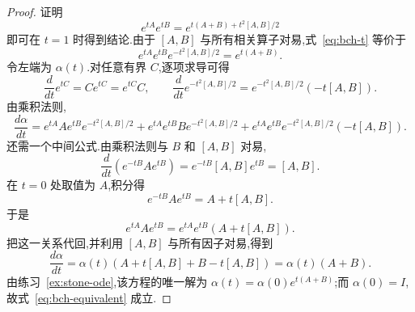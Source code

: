 \begin{proof}
证明
\[
e^{tA}e^{tB}=e^{t(A+B)+t^2[A,B]/2}
\label{eq:bch-t}
\]
即可在 $t=1$ 时得到结论.由于 $[A,B]$ 与所有相关算子对易,式~\eqref{eq:bch-t} 等价于
\[
e^{tA}e^{tB}e^{-t^2[A,B]/2}=e^{t(A+B)}.
\label{eq:bch-equivalent}
\]
令左端为 $\alpha(t)$.对任意有界 $C$,逐项求导可得
\[
\frac{d}{dt}e^{tC}=Ce^{tC}=e^{tC}C,
\qquad
\frac{d}{dt}e^{-t^2[A,B]/2}=e^{-t^2[A,B]/2}(-t[A,B]).
\]
由乘积法则,
\[
\frac{d\alpha}{dt}=e^{tA}Ae^{tB}e^{-t^2[A,B]/2}
+e^{tA}e^{tB}Be^{-t^2[A,B]/2}
+e^{tA}e^{tB}e^{-t^2[A,B]/2}(-t[A,B]).
\]
还需一个中间公式.由乘积法则与 $B$ 和 $[A,B]$ 对易,
\[
\frac{d}{dt}\left(e^{-tB}Ae^{tB}\right)=e^{-tB}[A,B]e^{tB}=[A,B].
\]
在 $t=0$ 处取值为 $A$,积分得
\[
e^{-tB}Ae^{tB}=A+t[A,B].
\label{eq:bch-conjugation}
\]
于是
\[
e^{tA}Ae^{tB}=e^{tA}e^{tB}(A+t[A,B]).
\]
把这一关系代回,并利用 $[A,B]$ 与所有因子对易,得到
\[
\frac{d\alpha}{dt}=\alpha(t)(A+t[A,B]+B-t[A,B])=\alpha(t)(A+B).
\]
由练习~\ref{ex:stone-ode},该方程的唯一解为 $\alpha(t)=\alpha(0)e^{t(A+B)}$;而 $\alpha(0)=I$,故式~\eqref{eq:bch-equivalent} 成立.
\end{proof}

